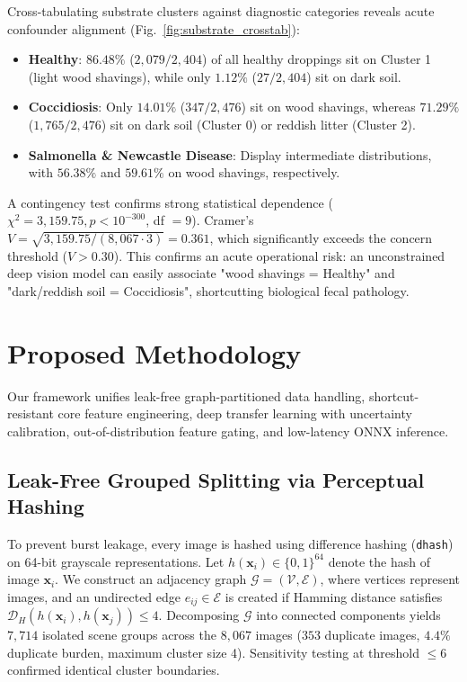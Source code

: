 \documentclass[conference]{IEEEtran}
\begin{document}
Cross-tabulating substrate clusters against diagnostic categories reveals acute confounder alignment (Fig.~\ref{fig:substrate_crosstab}):
\begin{itemize}\setlength{\itemsep}{0.5pt}\setlength{\parskip}{0pt}\setlength{\parsep}{0pt}
    \item \textbf{Healthy}: $86.48\%$ ($2{,}079/2{,}404$) of all healthy droppings sit on Cluster 1 (light wood shavings), while only $1.12\%$ ($27/2{,}404$) sit on dark soil.
    \item \textbf{Coccidiosis}: Only $14.01\%$ ($347/2{,}476$) sit on wood shavings, whereas $71.29\%$ ($1{,}765/2{,}476$) sit on dark soil (Cluster 0) or reddish litter (Cluster 2).
    \item \textbf{Salmonella \& Newcastle Disease}: Display intermediate distributions, with $56.38\%$ and $59.61\%$ on wood shavings, respectively.
\end{itemize}

A contingency test confirms strong statistical dependence ($\chi^2 = 3{,}159.75, p < 10^{-300}$, df $= 9$). Cramer's $V = \sqrt{3{,}159.75 / (8{,}067 \cdot 3)} = 0.361$, which significantly exceeds the concern threshold ($V > 0.30$). This confirms an acute operational risk: an unconstrained deep vision model can easily associate "wood shavings = Healthy" and "dark/reddish soil = Coccidiosis", shortcutting biological fecal pathology.

\section{Proposed Methodology}
Our framework unifies leak-free graph-partitioned data handling, shortcut-resistant core feature engineering, deep transfer learning with uncertainty calibration, out-of-distribution feature gating, and low-latency ONNX inference.

\subsection{Leak-Free Grouped Splitting via Perceptual Hashing}
To prevent burst leakage, every image is hashed using difference hashing (\texttt{dhash}) on 64-bit grayscale representations. Let $h(\mathbf{x}_i) \in \{0, 1\}^{64}$ denote the hash of image $\mathbf{x}_i$. We construct an adjacency graph $\mathcal{G} = (\mathcal{V}, \mathcal{E})$, where vertices represent images, and an undirected edge $e_{ij} \in \mathcal{E}$ is created if Hamming distance satisfies $\mathcal{D}_H(h(\mathbf{x}_i), h(\mathbf{x}_j)) \le 4$. Decomposing $\mathcal{G}$ into connected components yields $7{,}714$ isolated scene groups across the $8{,}067$ images ($353$ duplicate images, $4.4\%$ duplicate burden, maximum cluster size 4). Sensitivity testing at threshold $\le 6$ confirmed identical cluster boundaries.
\end{document}
